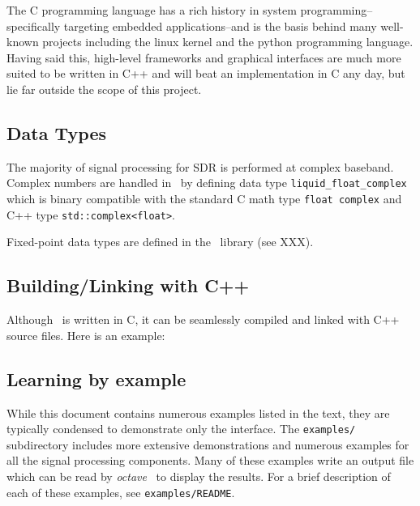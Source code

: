 The C programming language has a rich history in system programming--
specifically targeting embedded applications--and is the basis behind many
well-known projects including the linux kernel and the python programming
language.
Having said this, high-level frameworks and graphical interfaces are much more
suited to be written in C++ and will beat an implementation in C any day,
but lie far outside the scope of this project.

\subsection{Data Types}
The majority of signal processing for SDR is performed at complex baseband.
Complex numbers are handled in \liquid\ by defining data type
{\tt liquid\_float\_complex} which is binary compatible with the standard
C math type {\tt float complex} and C++ type {\tt std::complex<float>}.

Fixed-point data types are defined in the \liquidfpm\ library (see XXX).

\subsection{Building/Linking with C++}
Although \liquid\ is written in C, it can be seamlessly compiled and linked
with C++ source files.
Here is an example:



\subsection{Learning by example}
\label{section:learning_by_example}
While this document contains numerous examples listed in the text, they are
typically condensed to demonstrate only the interface.
The {\tt examples/} subdirectory includes more extensive demonstrations and
numerous examples for all the signal processing components.
Many of these examples write an output file which can be read by
{\em octave}~\cite{octave:web} to display the results.
For a brief description of each of these examples, see {\tt examples/README}.

